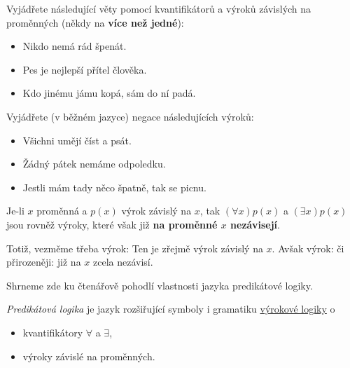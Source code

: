 \begin{exercise}
  Vyjádřete následující věty pomocí kvantifikátorů a výroků závislých na
  proměnných (někdy na \textbf{více než jedné}):
  \begin{itemize}
    \item Nikdo nemá rád špenát.
    \item Pes je nejlepší přítel člověka.
    \item Kdo jinému jámu kopá, sám do ní padá.
  \end{itemize}
\end{exercise}
\lessboxspace
\begin{exercise}
  Vyjádřete (v běžném jazyce) negace následujících výroků:
  \begin{itemize}
    \item Všichni umějí číst a psát.
    \item Žádný pátek nemáme odpoledku.
    \item Jestli mám tady něco špatně, tak se picnu.
  \end{itemize}
\end{exercise}
\lessboxspace
\begin{warning}
  Je-li $x$ proměnná a $p(x)$ výrok závislý na $x$, tak $( \forall x)p(x)$ a $(
  \exists x)p(x)$ jsou rovněž výroky, které však již \textbf{na proměnné $x$
  nezávisejí}.

  Totiž, vezměme třeba výrok:  Ten je zřejmě výrok
  závislý na $x$. Avšak výrok:  či
  přirozeněji:  již na $x$ zcela nezávisí.
\end{warning}

Shrneme zde ku čtenářově pohodlí vlastnosti jazyka predikátové logiky.
\begin{definition}
  \label{def:predikatova-logika}
  \emph{Predikátová logika} je jazyk rozšiřující symboly i gramatiku
  \hyperref[def:vyrokova-logika]{výrokové logiky} o
  \begin{itemize}
    \item kvantifikátory $ \forall $ a $ \exists $,
    \item výroky závislé na proměnných.
  \end{itemize}
\end{definition}
